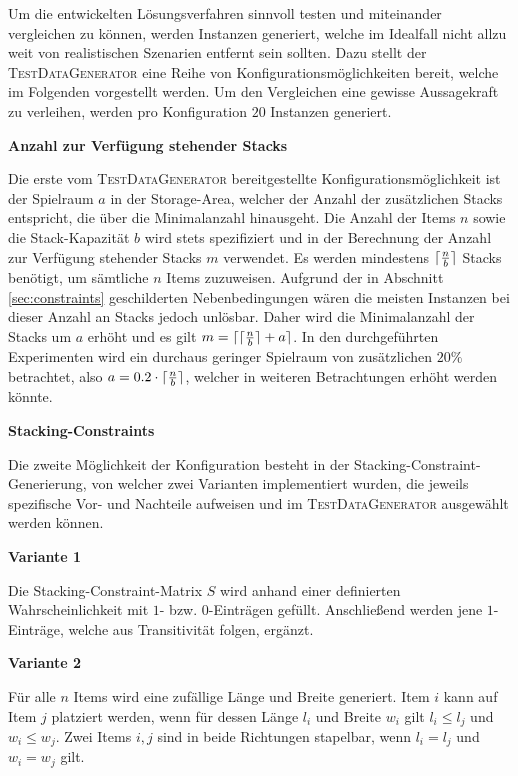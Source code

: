 Um die entwickelten Lösungsverfahren sinnvoll testen und miteinander vergleichen zu können,
werden Instanzen generiert, welche im Idealfall nicht allzu weit von realistischen Szenarien entfernt
sein sollten. Dazu stellt der \textsc{TestDataGenerator} eine Reihe von Konfigurationsmöglichkeiten
bereit, welche im Folgenden vorgestellt werden. Um den Vergleichen eine gewisse Aussagekraft zu verleihen,
werden pro Konfiguration $20$ Instanzen generiert.

\textbf{Anzahl zur Verfügung stehender Stacks}

Die erste vom \textsc{TestDataGenerator} bereitgestellte Konfigurationsmöglichkeit ist der Spielraum $a$ in der Storage-Area, welcher der Anzahl der zusätzlichen Stacks entspricht, die über die Minimalanzahl hinausgeht.
Die Anzahl der Items $n$ sowie die Stack-Kapazität $b$ wird stets spezifiziert und in der Berechnung der Anzahl zur Verfügung stehender Stacks $m$ verwendet. Es werden mindestens $\lceil\frac{n}{b}\rceil$ Stacks benötigt, um sämtliche $n$ Items zuzuweisen.
Aufgrund der in Abschnitt \ref{sec:constraints} geschilderten Nebenbedingungen wären die meisten Instanzen bei dieser
Anzahl an Stacks jedoch unlösbar. Daher wird die Minimalanzahl der Stacks um $a$ erhöht und es gilt
$m = \lceil\lceil\frac{n}{b}\rceil + a\rceil$. In den durchgeführten Experimenten wird ein durchaus geringer Spielraum von
zusätzlichen $20 \%$ betrachtet, also $a = 0.2 \cdot \lceil\frac{n}{b}\rceil$, welcher in weiteren Betrachtungen erhöht werden könnte.

\pagebreak

\textbf{Stacking-Constraints}

Die zweite Möglichkeit der Konfiguration besteht in der Stacking-Constraint-Generierung,
von welcher zwei Varianten implementiert wurden, die jeweils spezifische Vor- und Nachteile aufweisen
und im \textsc{TestDataGenerator} ausgewählt werden können.

\textbf{Variante 1}

Die Stacking-Constraint-Matrix $S$ wird anhand einer definierten Wahrscheinlichkeit mit $1$- bzw. $0$-Einträgen gefüllt. Anschließend werden jene $1$-Einträge, welche aus Transitivität folgen, ergänzt.

\textbf{Variante 2}

Für alle $n$ Items wird eine zufällige Länge und Breite generiert. Item $i$ kann auf Item $j$
platziert werden, wenn für dessen Länge $l_i$ und Breite $w_i$ gilt $l_i \leq l_j$ und $w_i \leq w_j$.
Zwei Items $i, j$ sind in beide Richtungen stapelbar, wenn $l_i = l_j$ und $w_i = w_j$ gilt.

